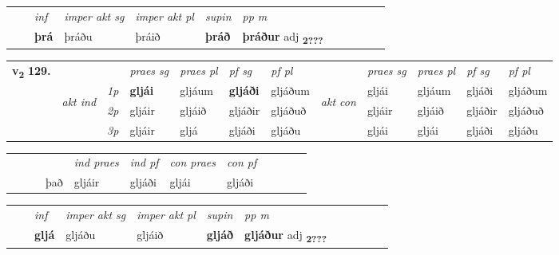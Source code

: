 \begin{tabular}{llllllllllll}
 & & \textit{inf} & \textit{imper akt sg} & \textit{imper akt pl}    & \textit{supin}  & \textit{pp m}     \\*
  & & \textbf{þrá} & þráðu  & þráið    &  \textbf{þráð}  & \textbf{þráður} adj \textbf{\textsubscript{2???}} \\*
\cmidrule{1-12}
\end{tabular}



\begin{tabular}{llllllllllll} \toprule
\multirow{4}{*}{{{\textbf{v{\textsubscript{2}}} \Large{\textbf{129.}}}}}  & &   &  \textit{praes sg}  & \textit{praes pl}  &\textit{ pf sg} & \textit{pf pl} &  &  \textit{praes sg}  & \textit{praes pl}  & \textit{pf sg} & \textit{pf pl } \\*
	\cmidrule{4-7} \cmidrule{9-12}
 & \multirow{3}{*}{\begin{turn}{90}\textit{akt ind}\end{turn}} & {\textit{1p}} & \textbf{gljái} & gljáum    & \textbf{gljáði} & gljáðum & \multirow{3}{*}{\begin{turn}{90}\textit{akt con}\end{turn}} &gljái & gljáum & gljáði & gljáðum\\*
& &  {\textit{2p}} &  gljáir  & gljáið   & gljáðir & gljáðuð & & gljáir & gljáið & gljáðir & gljáðuð \\*
& &  {\textit{3p}} & gljáir & gljá   & gljáði & gljáðu & & gljái & gljái& gljáði & gljáðu  \\*
\cmidrule{4-7} \cmidrule{9-12}
\end{tabular}


\begin{tabular}{llllllllllll}
 & &  & &  \textit{ind praes} & \textit{ind pf} & \textit{con praes} & \textit{con pf} \\*
&  & & það & gljáir & gljáði & gljái & gljáði \\*
\cmidrule{5-9}
\end{tabular}


\begin{tabular}{llllllllllll}
 & & \textit{inf} & \textit{imper akt sg} & \textit{imper akt pl}    & \textit{supin}  & \textit{pp m}     \\*
  & & \textbf{gljá} & gljáðu  & gljáið    &  \textbf{gljáð}  & \textbf{gljáður} adj \textbf{\textsubscript{2???}} \\*
\cmidrule{1-12}
\end{tabular}



